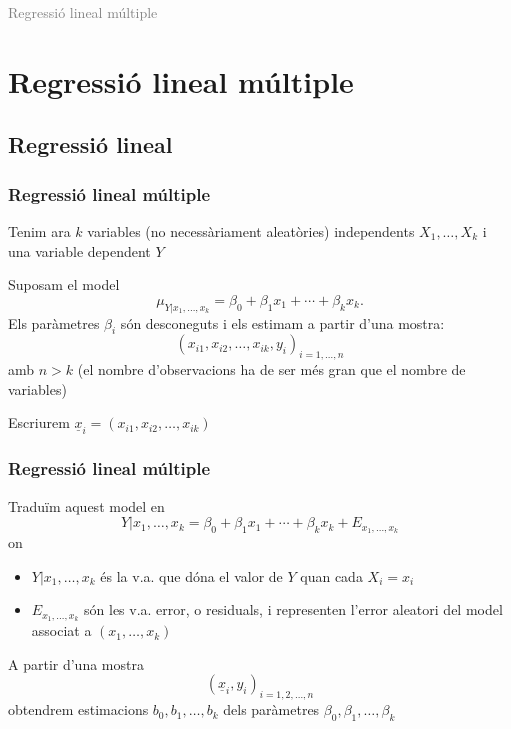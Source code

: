 \documentclass[12pt,t]{beamer}
\title[\red{Matemàtiques III}]{}
\author[]{}
\date{}
\newcommand{\gray}[1]{\textcolor{gray}{#1}}
\theoremstyle{plain}
\theoremstyle{definition}
\begin{document}
\beamertemplatedotitem

\lstset{breaklines=true}
\lstset{basicstyle=\ttfamily}


\begin{frame}
\vfill
\begin{center}
\gray{\LARGE Regressió lineal múltiple}
\end{center}
\vfill
\end{frame}



\section{Regressió lineal múltiple}
\subsection{Regressió lineal}

\begin{frame}
\frametitle{Regressió lineal múltiple}

Tenim ara $k$ variables (no necessàriament aleatòries) independents $X_1,\ldots, X_k$ i una
variable dependent $Y$
\medskip

Suposam el model
$$
\mu_{Y|x_1,\ldots,x_k}= \beta_0+\beta_1 x_1+\cdots+\beta_k x_k.
$$
Els paràmetres $\beta_i$ són desconeguts i els estimam  a partir d'una mostra:
$$
(x_{i1},x_{i2},\ldots,x_{ik},y_i)_{i=1,\ldots,n}
$$
amb $n>k$ (el nombre d'observacions ha de ser més gran que el nombre de variables)
\medskip

Escriurem $\underline{x}_i=(x_{i1},x_{i2},\ldots,x_{ik})$
\end{frame}

\begin{frame}
\frametitle{Regressió lineal múltiple}
\vspace*{-2ex}

Traduïm aquest model en
$$
Y|x_1,\ldots,x_k=\beta_0+\beta_1 x_{1}+\cdots+\beta_{k} x_k+E_{x_1,\ldots,x_k}
$$
on
\begin{itemize}
\item $Y|x_1,\ldots,x_k$ és la v.a. que dóna el valor de $Y$ quan cada $X_i=x_i$
\medskip

\item $E_{x_1,\ldots,x_k}$ són les v.a. error, o residuals, i representen l'error aleatori del model associat a
$(x_1,\ldots,x_k)$
\end{itemize}

A partir d'una mostra
$$
(\underline{x}_{i},y_i)_{i=1,2,\ldots,n}
$$
obtendrem estimacions $b_0,b_1,\ldots,b_k$ dels paràmetres $\beta_0,\beta_1,\ldots,\beta_k$
\end{frame}
\end{document}
